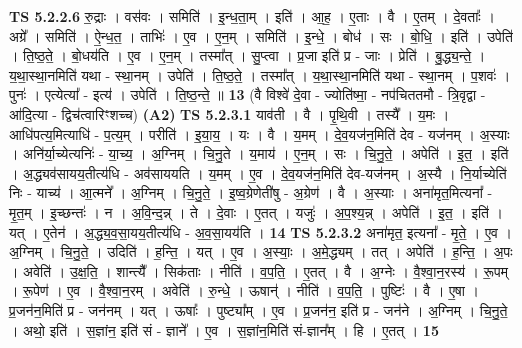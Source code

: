 \documentclass[17pt]{extarticle}
\begin{document}
                  \newline
                                \textbf{ TS 5.2.2.6} \newline
                  रु॒द्राः । वस॑वः । समिति॑ । इ॒न्ध॒ता॒म् । इति॑ । आ॒ह॒ । ए॒ताः । वै । ए॒तम् । दे॒वताः᳚ । अग्रे᳚ । समिति॑ । ऐ॒न्ध॒त॒ । ताभिः॑ । ए॒व । ए॒न॒म् । समिति॑ । इ॒न्धे॒ । बोध॑ । सः । बो॒धि॒ । इति॑ । उपेति॑ । ति॒ष्ठ॒ते॒ । बो॒धय॑ति । ए॒व । ए॒न॒म् । तस्मा᳚त् । सु॒प्त्वा । प्र॒जा इति॑ प्र - जाः । प्रेति॑ । बु॒द्ध्य॒न्ते॒ । य॒था॒स्था॒नमिति॑ यथा - स्था॒नम् । उपेति॑ । ति॒ष्ठ॒ते॒ । तस्मा᳚त् । य॒था॒स्था॒नमिति॑ यथा - स्था॒नम् । प॒शवः॑ । पुनः॑ । एत्येत्या᳚ - इत्य॑ । उपेति॑ । ति॒ष्ठ॒न्ते॒ ॥ \textbf{  13} \newline
                  \newline
                      (वै विश्वे॑ दे॒वा - ज्योति॑ष्मा॒ - नप॑चिततमौ - त्रि॒वृद्वा - आ॑दि॒त्या - द्विच॑त्वारिꣳशच्च)  \textbf{(A2)} \newline \newline
                                \textbf{ TS 5.2.3.1} \newline
                  याव॑ती । वै । पृ॒थि॒वी । तस्यै᳚ । य॒मः । आधि॑पत्य॒मित्याधि॑ - प॒त्य॒म् । परीति॑ । इ॒या॒य॒ । यः । वै । य॒मम् । दे॒व॒यज॑न॒मिति॑ देव - यज॑नम् । अ॒स्याः । अनि॑र्या॒च्येत्यनिः॑ - या॒च्य॒ । अ॒ग्निम् । चि॒नु॒ते । य॒माय॑ । ए॒न॒म् । सः । चि॒नु॒ते॒ । अपेति॑ । इ॒त॒ । इति॑ । अ॒द्ध्यव॑सायय॒तीत्य॑धि - अव॑साययति । य॒मम् । ए॒व । दे॒व॒यज॑न॒मिति॑ देव-यज॑नम् । अ॒स्यै । नि॒र्याच्येति॑ निः - याच्य॑ । आ॒त्मने᳚ । अ॒ग्निम् । चि॒नु॒ते॒ । इ॒ष्व॒ग्रेणेती॑षु - अ॒ग्रेण॑ । वै । अ॒स्याः । अना॑मृत॒मित्यना᳚ - मृ॒त॒म् । इ॒च्छन्तः॑ । न । अ॒वि॒न्द॒न्न् । ते । दे॒वाः । ए॒तत् । यजुः॑ । अ॒प॒श्य॒न्न् । अपेति॑ । इ॒त॒ । इति॑ । यत् । ए॒तेन॑ । अ॒द्ध्य॒व॒सा॒यय॒तीत्य॑धि - अ॒व॒सा॒यय॑ति । \textbf{  14} \newline
                  \newline
                                \textbf{ TS 5.2.3.2} \newline
                  अना॑मृत॒ इत्यना᳚ - मृ॒ते॒ । ए॒व । अ॒ग्निम् । चि॒नु॒ते॒ । उदिति॑ । ह॒न्ति॒ । यत् । ए॒व । अ॒स्याः॒ । अ॒मे॒द्ध्यम् । तत् । अपेति॑ । ह॒न्ति॒ । अ॒पः । अवेति॑ । उ॒क्ष॒ति॒ । शान्त्यै᳚ । सिक॑ताः । नीति॑ । व॒प॒ति॒ । ए॒तत् । वै । अ॒ग्नेः । वै॒श्वा॒न॒रस्य॑ । रू॒पम् । रू॒पेण॑ । ए॒व । वै॒श्वा॒न॒रम् । अवेति॑ । रु॒न्धे॒ । ऊषान्॑ । नीति॑ । व॒प॒ति॒ । पुष्टिः॑ । वै । ए॒षा । प्र॒जन॑न॒मिति॑ प्र - जन॑नम् । यत् । ऊषाः᳚ । पुष्ट्या᳚म् । ए॒व । प्र॒जन॑न॒ इति॑ प्र - जन॑ने । अ॒ग्निम् । चि॒नु॒ते॒ । अथो॒ इति॑ । स॒ज्ञांन॒ इति॑ सं - ज्ञाने᳚ । ए॒व । स॒ज्ञांन॒मिति॑ सं-ज्ञान᳚म् । हि । ए॒तत् । \textbf{  15} \newline
\end{document}
